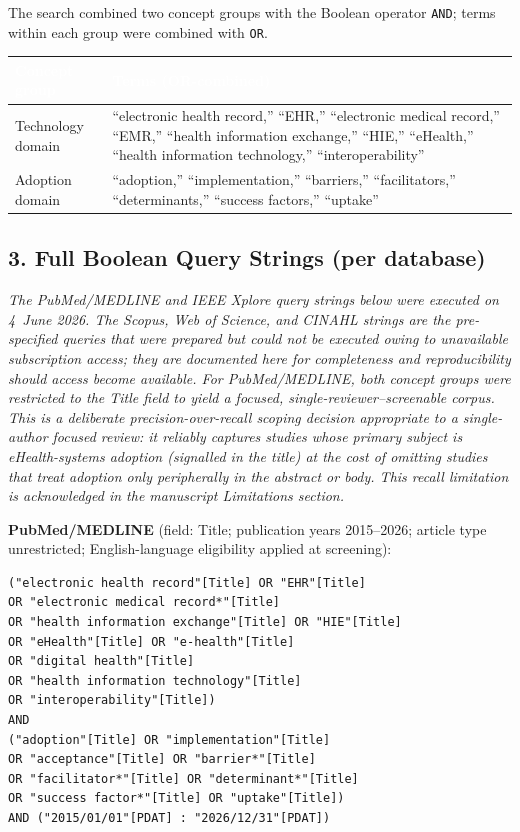 The search combined two concept groups with the Boolean operator \texttt{AND};
terms within each group were combined with \texttt{OR}.

\renewcommand{\arraystretch}{1.3}
\begin{table}[H]
\footnotesize
\centering
\begin{tabular}{p{3.0cm} p{11.0cm}}
\toprule
\rowcolor{headerblue}
\textcolor{white}{\textbf{Concept group}} &
\textcolor{white}{\textbf{Terms (OR-combined)}} \\
\midrule
\rowcolor{rowgray}
Technology domain &
``electronic health record,'' ``EHR,'' ``electronic medical record,'' ``EMR,''
``health information exchange,'' ``HIE,'' ``eHealth,'' ``health information
technology,'' ``interoperability'' \\
Adoption domain &
``adoption,'' ``implementation,'' ``barriers,'' ``facilitators,''
``determinants,'' ``success factors,'' ``uptake'' \\
\bottomrule
\end{tabular}
\end{table}

\subsection*{3. Full Boolean Query Strings (per database)}

\noindent\textit{The PubMed/MEDLINE and IEEE Xplore query strings below were
executed on 4~June 2026. The Scopus, Web of Science, and CINAHL strings are the
pre-specified queries that were prepared but could not be executed owing to
unavailable subscription access; they are documented here for completeness and
reproducibility should access become available.
For PubMed/MEDLINE, both concept groups were restricted to the Title field to
yield a focused, single-reviewer--screenable corpus. This is a deliberate
precision-over-recall scoping decision appropriate to a single-author focused
review: it reliably captures studies whose primary subject is eHealth-systems
adoption (signalled in the title) at the cost of omitting studies that treat
adoption only peripherally in the abstract or body. This recall limitation is
acknowledged in the manuscript Limitations section.}

\medskip
\noindent\textbf{PubMed/MEDLINE} (field: Title; publication years 2015--2026;
article type unrestricted; English-language eligibility applied at screening): \\
{\footnotesize\begin{verbatim}
("electronic health record"[Title] OR "EHR"[Title]
OR "electronic medical record*"[Title]
OR "health information exchange"[Title] OR "HIE"[Title]
OR "eHealth"[Title] OR "e-health"[Title]
OR "digital health"[Title]
OR "health information technology"[Title]
OR "interoperability"[Title])
AND
("adoption"[Title] OR "implementation"[Title]
OR "acceptance"[Title] OR "barrier*"[Title]
OR "facilitator*"[Title] OR "determinant*"[Title]
OR "success factor*"[Title] OR "uptake"[Title])
AND ("2015/01/01"[PDAT] : "2026/12/31"[PDAT])
\end{verbatim}}


